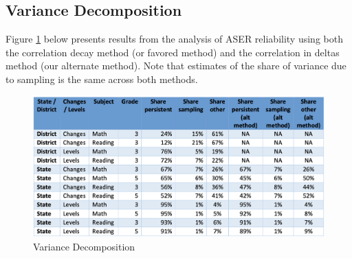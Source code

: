 \documentclass[
  11pt,
]{article}
\begin{document}
\hypertarget{variance-decomposition}{%
\subsection{Variance Decomposition}\label{variance-decomposition}}

Figure \ref{fig:variance} below presents results from the analysis of ASER reliability using both the correlation decay method (or favored method) and the correlation in deltas method (our alternate method). Note that estimates of the share of variance due to sampling is the same across both methods.

\begin{figure}

{\centering \includegraphics[width=0.8\linewidth]{variance_decomp} 

}

\caption{Variance Decomposition}\label{fig:variance}
\end{figure}
\end{document}
